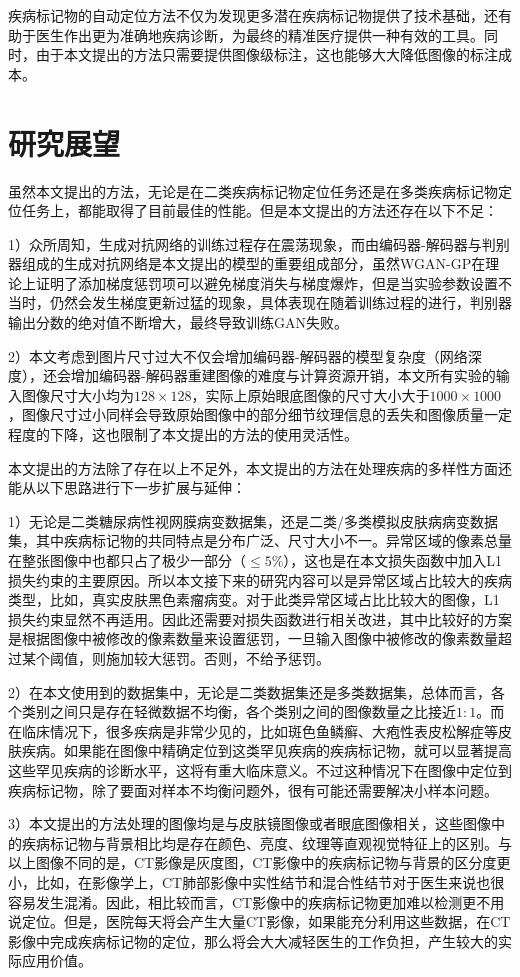 疾病标记物的自动定位方法不仅为发现更多潜在疾病标记物提供了技术基础，还有助于医生作出更为准确地疾病诊断，为最终的精准医疗提供一种有效的工具。同时，由于本文提出的方法只需要提供图像级标注，这也能够大大降低图像的标注成本。

\section{研究展望}
虽然本文提出的方法，无论是在二类疾病标记物定位任务还是在多类疾病标记物定位任务上，都能取得了目前最佳的性能。但是本文提出的方法还存在以下不足：

1）众所周知，生成对抗网络的训练过程存在震荡现象，而由编码器-解码器与判别器组成的生成对抗网络是本文提出的模型的重要组成部分，虽然WGAN-GP在理论上证明了添加梯度惩罚项可以避免梯度消失与梯度爆炸，但是当实验参数设置不当时，仍然会发生梯度更新过猛的现象，具体表现在随着训练过程的进行，判别器输出分数的绝对值不断增大，最终导致训练GAN失败。

2）本文考虑到图片尺寸过大不仅会增加编码器-解码器的模型复杂度（网络深度），还会增加编码器-解码器重建图像的难度与计算资源开销，本文所有实验的输入图像尺寸大小均为$128\times 128$，实际上原始眼底图像的尺寸大小大于$1000\times 1000$，图像尺寸过小同样会导致原始图像中的部分细节纹理信息的丢失和图像质量一定程度的下降，这也限制了本文提出的方法的使用灵活性。

本文提出的方法除了存在以上不足外，本文提出的方法在处理疾病的多样性方面还能从以下思路进行下一步扩展与延伸：

1）无论是二类糖尿病性视网膜病变数据集，还是二类/多类模拟皮肤病病变数据集，其中疾病标记物的共同特点是分布广泛、尺寸大小不一。异常区域的像素总量在整张图像中也都只占了极少一部分（$\le 5\%$），这也是在本文损失函数中加入L1损失约束的主要原因。所以本文接下来的研究内容可以是异常区域占比较大的疾病类型，比如，真实皮肤黑色素瘤病变。对于此类异常区域占比比较大的图像，L1损失约束显然不再适用。因此还需要对损失函数进行相关改进，其中比较好的方案是根据图像中被修改的像素数量来设置惩罚，一旦输入图像中被修改的像素数量超过某个阈值，则施加较大惩罚。否则，不给予惩罚。

2）在本文使用到的数据集中，无论是二类数据集还是多类数据集，总体而言，各个类别之间只是存在轻微数据不均衡，各个类别之间的图像数量之比接近$1:1$。而在临床情况下，很多疾病是非常少见的，比如斑色鱼鳞癣、大疱性表皮松解症等皮肤疾病。如果能在图像中精确定位到这类罕见疾病的疾病标记物，就可以显著提高这些罕见疾病的诊断水平，这将有重大临床意义。不过这种情况下在图像中定位到疾病标记物，除了要面对样本不均衡问题外，很有可能还需要解决小样本问题。

3）本文提出的方法处理的图像均是与皮肤镜图像或者眼底图像相关，这些图像中的疾病标记物与背景相比均是存在颜色、亮度、纹理等直观视觉特征上的区别。与以上图像不同的是，CT影像是灰度图，CT影像中的疾病标记物与背景的区分度更小，比如，在影像学上，CT肺部影像中实性结节和混合性结节对于医生来说也很容易发生混淆。因此，相比较而言，CT影像中的疾病标记物更加难以检测更不用说定位。但是，医院每天将会产生大量CT影像，如果能充分利用这些数据，在CT影像中完成疾病标记物的定位，那么将会大大减轻医生的工作负担，产生较大的实际应用价值。
